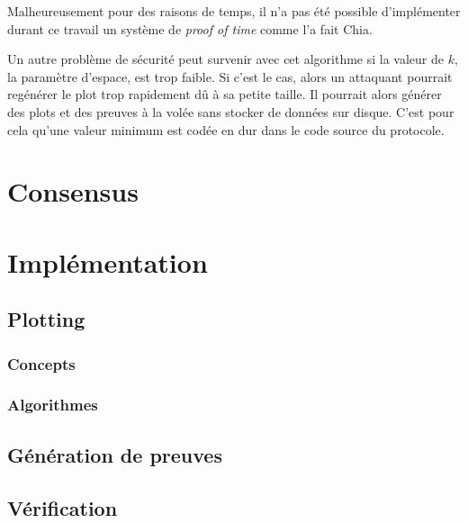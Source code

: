 Malheureusement pour des raisons de temps, il n'a pas été possible d'implémenter durant ce travail un système de \emph{proof of time} comme l'a fait Chia. 

Un autre problème de sécurité peut survenir avec cet algorithme si la valeur de $k$, la paramètre d'espace, est trop faible. Si c'est le cas, alors un attaquant pourrait regénérer le plot trop rapidement dû à sa petite taille. Il pourrait alors générer des plots et des preuves à la volée sans stocker de données sur disque. C'est pour cela qu'une valeur minimum est codée en dur dans le code source du protocole.

\section{Consensus}

\lipsum[1]

\section{Implémentation}

\lipsum[1]

\subsection{Plotting}

\lipsum[1]

\subsubsection*{Concepts}

\lipsum[1]

\subsubsection*{Algorithmes}

\lipsum[1]

\subsection{Génération de preuves}

\lipsum[1]

\subsection{Vérification}

\lipsum[1]

